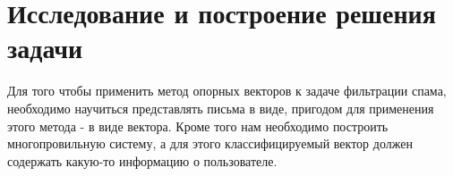 \newpage
\section{Исследование и построение решения задачи}
\label{research}

Для того чтобы применить метод опорных векторов к задаче фильтрации спама,
необходимо научиться представлять письма в виде, пригодом для применения
этого метода - в виде вектора.
Кроме того нам необходимо построить многопровильную систему, а для этого
классифицируемый вектор должен содержать какую-то информацию о пользователе.

